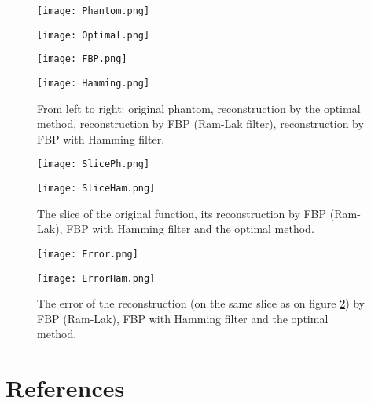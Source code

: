 \documentclass[12pt]{iopart}
\begin{document}
	 \begin{figure}[H]    
        \begin{minipage}[t]{0.24\textwidth}
            \texttt{[image: Phantom.png]}
        \end{minipage}
        \begin{minipage}[t]{0.24\textwidth}
            \texttt{[image: Optimal.png]}
        \end{minipage}
        \begin{minipage}[t]{0.24\textwidth}
            \texttt{[image: FBP.png]}
        \end{minipage}
        \begin{minipage}[t]{0.24\textwidth}
            \texttt{[image: Hamming.png]}
        \end{minipage}
        \caption{From left to right: original phantom, reconstruction by the optimal method, reconstruction by FBP (Ram-Lak filter), reconstruction by FBP with Hamming filter.}
        \label{Phantom}
    \end {figure}    
    
    \begin{figure}[H]    
        \begin{minipage}[t]{0.5\textwidth}
            \texttt{[image: SlicePh.png]}
        \end{minipage}
        \hspace{\fill}
        \begin{minipage}[t]{0.5\textwidth}
            \texttt{[image: SliceHam.png]}
        \end{minipage}
        \caption{The slice of the original function, its reconstruction by FBP (Ram-Lak), FBP with Hamming filter and the optimal method.}
        \label{Slice}
    \end {figure}    
    
    \begin{figure}[H]    
        \begin{minipage}[t]{0.5\textwidth}
            \texttt{[image: Error.png]}
        \end{minipage}
        \hspace{\fill}
        \begin{minipage}[t]{0.5\textwidth}
            \texttt{[image: ErrorHam.png]}
        \end{minipage}
        \caption{The error of the reconstruction (on the same slice as on figure \ref{Slice}) by FBP (Ram-Lak), FBP with Hamming filter and the optimal method.}
        \label{Error}
    \end {figure}    
	
	\section*{References}
	
	
	
\end{document}
